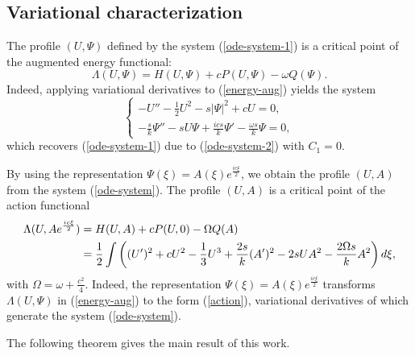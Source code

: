 \documentclass[12pt,reqno]{amsart}
\numberwithin{equation}{section}
\begin{document}
\subsection{Variational characterization}

The profile $(U,\Psi)$ defined by the system (\ref{ode-system-1}) is a critical point of the augmented energy functional:
\begin{equation}
    \label{energy-aug}
\Lambda(U,\Psi) = H(U,\Psi) + c P(U,\Psi) - \omega Q(\Psi).
\end{equation}
Indeed, applying variational derivatives to (\ref{energy-aug}) yields the system 
\begin{equation*}
\begin{cases}
-U'' - \frac{1}{2} U^2 - s \vert \Psi\vert^2 + c U =0, \\
-\frac{s}{k} \Psi'' - s U \Psi + \frac{i c s}{k}\Psi' - \frac{\omega s}{k} \Psi=0,
\end{cases}
\end{equation*}
which recovers (\ref{ode-system-1}) due to (\ref{ode-system-2}) with $C_1 = 0$. 

By using the representation $\Psi(\xi) = A(\xi) e^{\frac{ic \xi}{2}}$, we obtain the profile $(U,A)$ from the system (\ref{ode-system}). The profile 
$(U,A)$ is a critical point of the action functional
\begin{align}
\Lambda(U,A e^{\frac{ic \xi}{2}}) &= H(U,A) + c P(U,0) - \Omega Q(A) \notag \\
&= \frac{1}{2} \int \left(  (U')^2 + c U^2 - \frac{1}{3} U^3 + \frac{2 s}{k} (A')^2 - 2 s U A^2 - \frac{2 \Omega s}{k}  A^2 \right)d\xi,
    \label{action}
\end{align}
with $\Omega = \omega  +\frac{c^2}{4}$. Indeed, the representation $\Psi(\xi) = A(\xi) e^{\frac{ic \xi}{2}}$ transforms $\Lambda(U,\Psi)$ in (\ref{energy-aug}) to the form (\ref{action}), variational derivatives of which generate the system (\ref{ode-system}).

The following theorem gives the main result of this work. 
\end{document}
